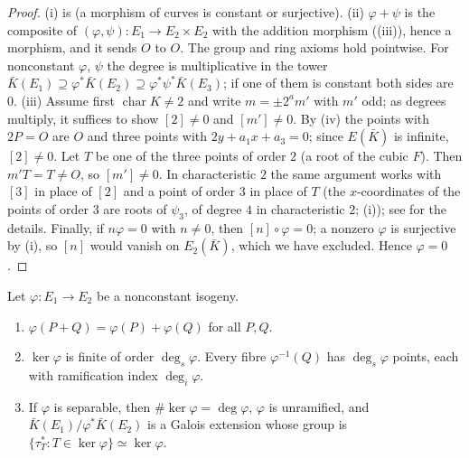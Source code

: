 \begin{proof}
(i) is  (a morphism of curves is constant or surjective). (ii) $\varphi+\psi$ is the composite of $(\varphi,\psi)\colon E_1\to E_2\times E_2$
with the addition morphism ((iii)), hence a morphism, and it sends $O$ to $O$. The group and ring axioms hold pointwise.
For nonconstant $\varphi$, $\psi$ the degree is multiplicative in the tower $\bar K(E_1)\supseteq\varphi^*\bar K(E_2)\supseteq\varphi^*\psi^*\bar K(E_3)$; if one of
them is constant both sides are $0$.
(iii) Assume first $\operatorname{char}K\ne2$ and write $m=\pm2^am'$ with $m'$ odd; as degrees multiply, it suffices to show $[2]\ne0$ and $[m']\ne0$. By
(iv) the points with $2P=O$ are $O$ and three points with $2y+a_1x+a_3=0$; since $E(\bar K)$ is infinite, $[2]\ne0$. Let $T$ be one of
the three points of order $2$ (a root of the cubic $F$). Then $m'T=T\ne O$, so $[m']\ne0$. In characteristic $2$ the same argument works with $[3]$ in place of $[2]$
and a point of order $3$ in place of $T$ (the $x$-coordinates of the points of order $3$ are roots of $\psi_3$, of degree $4$ in characteristic $2$; (i));
see \cite[Section III.4]{SilvermanAEC} for the details. Finally, if $n\varphi=0$ with $n\ne0$, then $[n]\circ\varphi=0$; a nonzero $\varphi$ is surjective by (i), so $[n]$ would vanish on $E_2(\bar K)$, which we have
excluded. Hence $\varphi=0$.
\end{proof}

\begin{theorem}\label{thm:ellcurves:isog-hom}
Let $\varphi\colon E_1\to E_2$ be a nonconstant isogeny.
\begin{enumerate}[label=(\roman*)]
\item $\varphi(P+Q)=\varphi(P)+\varphi(Q)$ for all $P,Q$.
\item $\ker\varphi$ is finite of order $\deg_s\varphi$. Every fibre $\varphi^{-1}(Q)$ has $\deg_s\varphi$ points, each with ramification index $\deg_i\varphi$.
\item If $\varphi$ is separable, then $\#\ker\varphi=\deg\varphi$, $\varphi$ is unramified, and $\bar K(E_1)/\varphi^*\bar K(E_2)$ is a Galois extension whose group is
$\{\tau_T^*:T\in\ker\varphi\}\simeq\ker\varphi$.
\end{enumerate}
\end{theorem}

